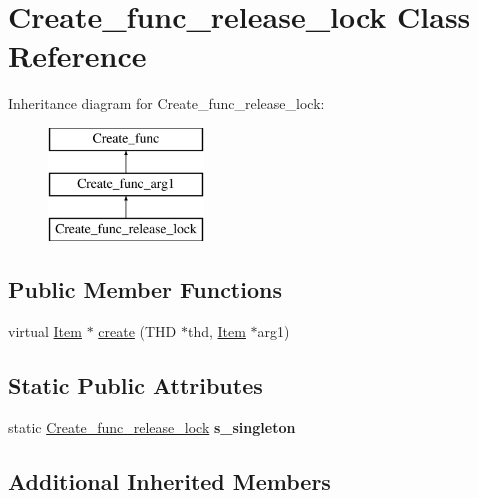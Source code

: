 \hypertarget{classCreate__func__release__lock}{}\section{Create\+\_\+func\+\_\+release\+\_\+lock Class Reference}
\label{classCreate__func__release__lock}
Inheritance diagram for Create\+\_\+func\+\_\+release\+\_\+lock\+:\begin{figure}[H]
\begin{center}
\leavevmode
\includegraphics[height=3.000000cm]{classCreate__func__release__lock}
\end{center}
\end{figure}
\subsection*{Public Member Functions}
\begin{DoxyCompactItemize}
\item 
virtual \mbox{\hyperlink{classItem}{Item}} $\ast$ \mbox{\hyperlink{classCreate__func__release__lock_a09fa05fcc06a1135357bca647076bde0}{create}} (T\+HD $\ast$thd, \mbox{\hyperlink{classItem}{Item}} $\ast$arg1)
\end{DoxyCompactItemize}
\subsection*{Static Public Attributes}
\begin{DoxyCompactItemize}
\item 
\mbox{\label{classCreate__func__release__lock_a61ee84aeaa6738db3c01716395c216b6}} 
static \mbox{\hyperlink{classCreate__func__release__lock}{Create\+\_\+func\+\_\+release\+\_\+lock}} {\bfseries s\+\_\+singleton}
\end{DoxyCompactItemize}
\subsection*{Additional Inherited Members}


